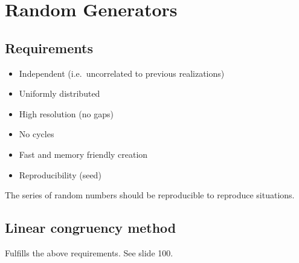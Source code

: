 \hypertarget{random-generators}{%
\section{Random Generators}\label{random-generators}}

\hypertarget{requirements}{%
\subsection{Requirements}\label{requirements}}

\begin{itemize}
\tightlist
\item
  Independent (i.e.~uncorrelated to previous realizations)
\item
  Uniformly distributed
\item
  High resolution (no gaps)
\item
  No cycles
\item
  Fast and memory friendly creation
\item
  Reproducibility (seed)
\end{itemize}

The series of random numbers should be reproducible to reproduce
situations.

\hypertarget{linear-congruency-method}{%
\subsection{Linear congruency method}\label{linear-congruency-method}}

Fulfills the above requirements. See slide 100.
